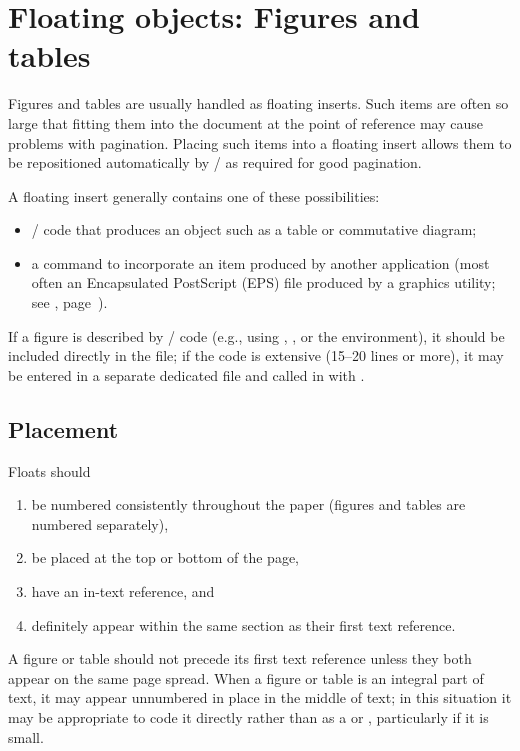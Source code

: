 \fi \fi

\section{Floating objects: Figures and tables}

Figures and tables are usually handled as floating inserts.  Such
items are often so large that fitting them into the document at the
point of reference may cause problems with pagination.  Placing such
items into a floating insert allows them to be repositioned
automatically by \latex/ as required for good pagination.

A floating insert generally contains one of these possibilities:
\begin{itemize}
\item \latex/ code that produces an object such as a table or
  commutative diagram;
\item a command to incorporate an item produced by another application
  (most often an Encapsulated PostScript (EPS) file produced by a
  graphics utility; see \textit{},
  page~\pageref{ch:graphics}).
\end{itemize}

If a figure is described by \latex/ code (e.g., using ,
, or the  environment), it should be included
directly in the file; if the code is extensive (15--20 lines or more), it
may be entered in a separate dedicated file and called in with .

\subsection{Placement}
Floats should
\begin{enumerate}
\item be numbered consistently throughout the paper (figures and tables
  are numbered separately),
\item be placed at the top or bottom of the page,
\item have an in-text reference, and
\item definitely appear within the same section as their first text
  reference.
\end{enumerate}

A figure or table should not precede its first text reference unless
they both appear on the same page spread.  When a figure or table is
an integral part of text, it may appear unnumbered in place in the
middle of text; in this situation it may be appropriate to code it
directly rather than as a  or , particularly
if it is small.

